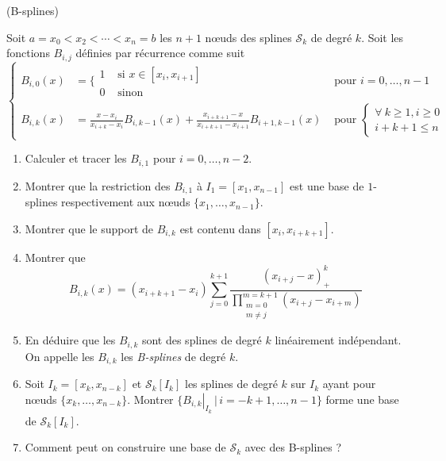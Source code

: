 \documentclass[a4paper,12pt,reqno]{amsart}
\begin{document}
\begin{exo} (B-splines)

  Soit $a=x_{0}<x_{2}<\cdots<x_{n}=b$ les $n+1$ nœuds des splines $\mathcal{S}_{k}$ de degré $k$. Soit les fonctions $B_{i,j}$ définies par récurrence comme suit
    $$
      \left\{
      \begin{array}{rll}
        B_{i,0}(x) & =
          \Bigg\{
          \begin{array}{rl}
            1 & \text{ si } x \in [x_{i},x_{i+1}]\\
            0 & \text{ sinon }
          \end{array}               & \text{ pour } i=0,\ldots,n-1\\[3ex]
        B_{i,k}(x) & = \frac{x-x_{i}}{x_{i+k}-x_{i}}B_{i,k-1}(x)
                  + \frac{x_{i+k+1}-x}{x_{i+k+1}-x_{i+1}}B_{i+1,k-1}(x)
                                    & \text{ pour }
                                      \left\{
                                        \begin{array}{r}
                                          \forall\ k \geq 1, i \geq 0\\
                                           i+k+1 \leq n
                                        \end{array}
                                      \right.
      \end{array}
      \right.
    $$\vspace{0pt}
  \begin{enumerate}
    \item Calculer et tracer les $B_{i,1}$ pour $i=0,\ldots,n-2$.
    \item Montrer que la restriction des $B_{i,1}$ à $I_{1}=[x_{1},x_{n-1}]$ est une base de $1$-splines respectivement aux nœuds $\{x_{1},\ldots,x_{n-1}\}$.
    \item Montrer que le support de $B_{i,k}$ est contenu dans $[x_{i},x_{i+k+1}]$.
    \item Montrer que
      $$
        B_{i,k}(x) = (x_{i+k+1}-x_{i})
            \sum_{j=0}^{k+1}
              \frac{(x_{i+j}-x)_{+}^{k}}{\displaystyle\prod_{\substack{m=0 \\ m\neq j}}^{m=k+1}(x_{i+j}-x_{i+m})}
      $$
    \item En déduire que les $B_{i,k}$ sont des splines de degré $k$ linéairement indépendant.\newline
      On appelle les $B_{i,k}$ les \emph{B-splines} de degré $k$.
    \item Soit $I_{k}=[x_{k},x_{n-k}]$ et  $\mathcal{S}_{k}[I_{k}]$ les splines de degré $k$ sur $I_{k}$ ayant pour nœuds $\{x_{k},\ldots,x_{n-k}\}$. Montrer $\{\left.B_{i,k}\right|_{I_{k}} \,|\, i=-k+1,\ldots,n-1 \}$ forme une base de $\mathcal{S}_{k}[I_{k}]$.
    \item Comment peut on construire une base de $\mathcal{S}_{k}$ avec des B-splines ?
  \end{enumerate}
\end{exo}
\end{document}
